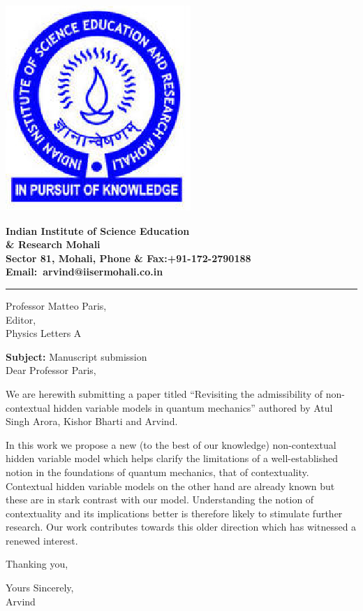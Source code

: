 \documentclass[12pt]{article}
\begin{document}
\thispagestyle{empty}
\hspace*{-20pt}
\includegraphics[scale=0.8,angle=0]{iiser_logo.eps}
\begin{minipage}[b]{13.5cm}
\begin{center}
\vspace*{-11pt}
\baselineskip=18pt
{\Large \bf Indian Institute of Science Education\\
\& Research Mohali}\\
{\bf Sector 81, Mohali, Phone \& Fax:+91-172-2790188 
Email:~arvind@iisermohali.co.in}
\vspace*{6pt}
\end{center}
\end{minipage}
\hrule
\vspace*{10pt}
\vspace*{10pt}
\begin{flushleft}
Professor Matteo Paris, \\
Editor,\\
Physics Letters A\\
\end{flushleft}
\vspace*{6pt}
\noindent
{\bf Subject:} Manuscript submission\\

\vspace*{6pt}
\noindent
{Dear Professor Paris,}

\vspace*{6pt}
  
We are herewith submitting a paper titled ``Revisiting the
admissibility of non-contextual hidden variable models in
quantum mechanics'' authored by Atul Singh Arora, Kishor
Bharti and Arvind.


In this work we propose a new (to the best of our knowledge)
non-contextual hidden variable model which helps clarify the
limitations of a well-established notion in the foundations
of quantum mechanics, that of contextuality. Contextual
hidden variable models on the other hand are already known
but these are in stark contrast with our model.
Understanding the notion of contextuality and its
implications better is therefore likely to stimulate further
research. Our work contributes towards this older direction
which has witnessed a renewed interest.

Thanking you, 


\vspace*{6pt}
\begin{flushright}
Yours Sincerely, \\
\vspace*{12pt}
Arvind\\
\end{flushright}
\end{document}
